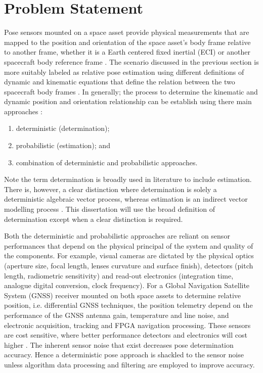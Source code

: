 \section{Problem Statement}\label{CHAP1_2}

Pose sensors mounted on a space asset provide physical measurements that are mapped to the position and orientation of the space asset's body frame relative to another frame, whether it is a Earth centered fixed inertial (ECI) or another spacecraft body reference frame \cite{PrezVillar2017SpacecraftPE}. The scenario discussed in the previous section is more suitably labeled as relative pose estimation using different definitions of dynamic and kinematic equations that define the relation between the two spacecraft body frames \cite{OpromollaPose17}.  In generally; the process to determine the kinematic and dynamic position and orientation relationship can be establish using there main approaches \cite{landisMarkleyFundamentalsOfADCSSpacecraft15}:
\begin{enumerate}
    \item deterministic (determination);
    \item probabilistic (estimation); and   
    \item combination of deterministic and probabilistic approaches. 
\end{enumerate}

Note the term determination is broadly used in literature to include estimation. There is, however, a clear distinction where determination is solely a deterministic algebraic vector process, whereas estimation is an indirect vector modelling process \cite{Dhahbane2021AttitudeDA}. This dissertation will use the broad definition of determination except when a clear distinction is required. 

Both the deterministic and probabilistic approaches are reliant on sensor performances that depend on the physical principal of the system and quality of the components. For example, visual cameras are dictated by the physical optics (aperture size, focal length, lenses curvature and surface finish), detectors (pitch length, radiometric sensitivity) and read-out electronics (integration time, analogue digital conversion, clock frequency). For a Global Navigation Satellite System (GNSS) receiver mounted on both space assets to determine relative position, i.e. differential GNSS techniques, the position telemetry depend on the performance of the GNSS antenna gain, temperature and line noise, and electronic  acquisition, tracking and FPGA navigation processing. These sensors are cost sensitive, where better performance detectors and electronics will cost higher \cite{hashim2021attitude}. The inherent sensor noise that exist decreases pose determination accuracy. Hence a deterministic pose approach is shackled to the sensor noise unless algorithm data processing and filtering are employed to improve accuracy\cite{OpromollaPose17}.

